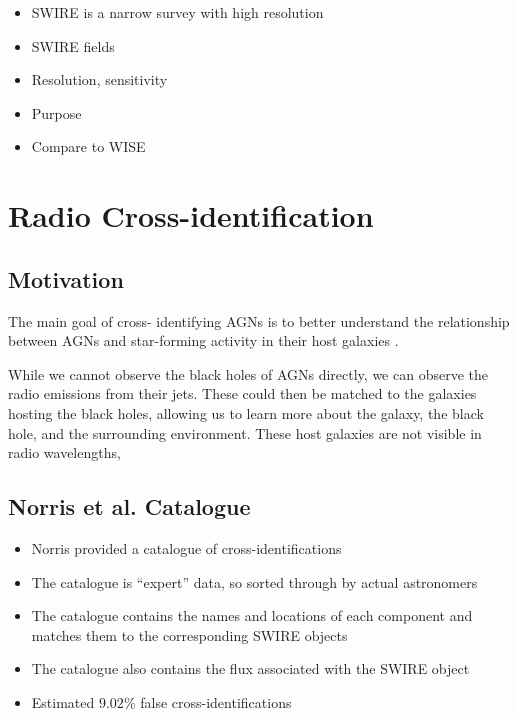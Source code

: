             \begin{itemize}
                \item SWIRE is a narrow survey with high resolution
                \item SWIRE fields
                \item Resolution, sensitivity
                \item Purpose
                \item Compare to WISE
            \end{itemize}

    \section{Radio Cross-identification}
    \label{sec:radio-cross-identification}

        \subsection{Motivation}
        \label{sec:cross-identification-motivation}

        The main goal of cross-
        identifying AGNs is to better understand the relationship between AGNs
        and star-forming activity in their host galaxies \citep{norris06}.

        While we cannot observe the black holes of AGNs directly, we can observe
        the radio emissions from their jets. These could then be matched to the
        galaxies hosting the black holes, allowing us to learn more about the
        galaxy, the black hole, and the surrounding environment. These host
        galaxies are not visible in radio wavelengths,

        \subsection{Norris et al. Catalogue}
        \label{sec:norris}

            \begin{itemize}
                \item Norris provided a catalogue of cross-identifications
                \item The catalogue is ``expert'' data, so sorted through by actual astronomers
                \item The catalogue contains the names and locations of each component and matches them to the corresponding SWIRE objects
                \item The catalogue also contains the flux associated with the SWIRE object
                \item Estimated $9.02\%$ false cross-identifications
            \end{itemize}

